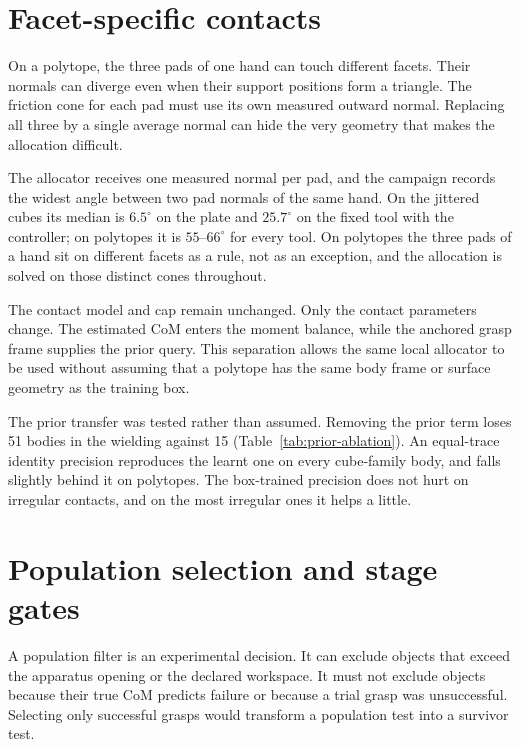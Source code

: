 \section{Facet-specific contacts}

On a polytope, the three pads of one hand can touch different facets. Their normals can diverge even when their support positions form a triangle. The friction cone for each pad must use its own measured outward normal. Replacing all three by a single average normal can hide the very geometry that makes the allocation difficult.

The allocator receives one measured normal per pad, and the campaign records the widest angle between two pad normals of the same hand. On the jittered cubes its median is $6.5^\circ$ on the plate and $25.7^\circ$ on the fixed tool with the controller; on polytopes it is $55$--$66^\circ$ for every tool. On polytopes the three pads of a hand sit on different facets as a rule, not as an exception, and the allocation is solved on those distinct cones throughout.

The contact model and cap remain unchanged. Only the contact parameters change. The estimated CoM enters the moment balance, while the anchored grasp frame supplies the prior query. This separation allows the same local allocator to be used without assuming that a polytope has the same body frame or surface geometry as the training box.

The prior transfer was tested rather than assumed. Removing the prior term loses 51 bodies in the wielding against 15 (Table~\ref{tab:prior-ablation}). An equal-trace identity precision reproduces the learnt one on every cube-family body, and falls slightly behind it on polytopes. The box-trained precision does not hurt on irregular contacts, and on the most irregular ones it helps a little.

\section{Population selection and stage gates}

A population filter is an experimental decision. It can exclude objects that exceed the apparatus opening or the declared workspace. It must not exclude objects because their true CoM predicts failure or because a trial grasp was unsuccessful. Selecting only successful grasps would transform a population test into a survivor test.


